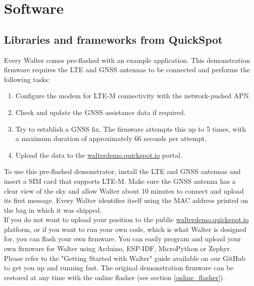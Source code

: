 \documentclass[11pt]{article}
\begin{document}
\section{Software}
\subsection{Libraries and frameworks from QuickSpot}

Every Walter comes pre-flashed with an example application. This demonstration firmware requires the LTE and GNSS antennas to be connected and performs the following tasks: 

\begin{enumerate}
    \item Configure the modem for LTE-M connectivity with the network-pushed APN.
    \item Check and update the GNSS assistance data if required.
    \item Try to establish a GNSS fix. The firmware attempts this up to 5 times, with a maximum duration of approximately 66 seconds per attempt.
    \item Upload the data to the \href{https://walterdemo.quickspot.io}{walterdemo.quickspot.io} portal.
\end{enumerate}

To use this pre-flashed demonstrator, install the LTE and GNSS antennas and insert a SIM card that supports LTE-M. Make sure the GNSS antenna has a clear view of the sky and allow Walter about 10 minutes to connect and upload its first message. Every Walter identifies itself using the MAC address printed on the bag in which it was shipped. \\

If you do not want to upload your position to the public \href{https://walterdemo.quickspot.io}{walterdemo.quickspot.io} platform, or if you want to run your own code, which is what Walter is designed for, you can flash your own firmware. You can easily program and upload your own firmware for Walter using Arduino, ESP-IDF, MicroPython or Zephyr. Please refer to the "Getting Started with Walter" guide available on our GitHub to get you up and running fast. The original demonstration firmware can be restored at any time with the online flasher (see section \ref{online_flasher}).
\end{document}
